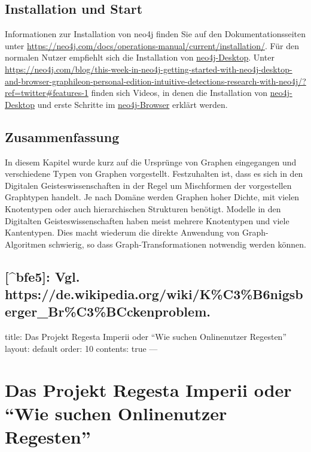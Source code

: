 \documentclass[12pt,ngerman,]{article}
\begin{document}
\subsection{Installation und Start}\label{installation-und-start}

Informationen zur Installation von neo4j finden Sie auf den
Dokumentationsseiten unter
\url{https://neo4j.com/docs/operations-manual/current/installation/}.
Für den normalen Nutzer empfiehlt sich die Installation von
\href{https://neo4j.com/download/}{neo4j-Desktop}. Unter
\url{https://neo4j.com/blog/this-week-in-neo4j-getting-started-with-neo4j-desktop-and-browser-graphileon-personal-edition-intuitive-detections-research-with-neo4j/?ref=twitter\#features-1}
finden sich Videos, in denen die Installation von
\href{https://www.youtube.com/watch?v=8yWhuUnPapw}{neo4j-Desktop} und
erste Schritte im
\href{https://www.youtube.com/watch?v=rQTximyaETA}{neo4j-Browser}
erklärt werden.

\subsection{Zusammenfassung}\label{zusammenfassung}

In diesem Kapitel wurde kurz auf die Ursprünge von Graphen eingegangen
und verschiedene Typen von Graphen vorgestellt. Festzuhalten ist, dass
es sich in den Digitalen Geisteswissenschaften in der Regel um
Mischformen der vorgestellen Graphtypen handelt. Je nach Domäne werden
Graphen hoher Dichte, mit vielen Knotentypen oder auch hierarchischen
Strukturen benötigt. Modelle in den Digitalten Geisteswissenschaften
haben meist mehrere Knotentypen und viele Kantentypen. Dies macht
wiederum die direkte Anwendung von Graph-Algoritmen schwierig, so dass
Graph-Transformationen notwendig werden können.

\subsection{{[}\^{}bfe5{]}: Vgl.
https://de.wikipedia.org/wiki/K\%C3\%B6nigsberger\_Br\%C3\%BCckenproblem.}\label{bfe5-vgl.-httpsde.wikipedia.orgwikikc3b6nigsberger_brc3bcckenproblem.}

title: Das Projekt Regesta Imperii oder ``Wie suchen Onlinenutzer
Regesten'' layout: default order: 10 contents: true ---

\section{\texorpdfstring{Das Projekt Regesta Imperii oder ``Wie suchen
Onlinenutzer
Regesten''}{Das Projekt Regesta Imperii oder Wie suchen Onlinenutzer Regesten}}\label{das-projekt-regesta-imperii-oder-wie-suchen-onlinenutzer-regesten}
\end{document}
